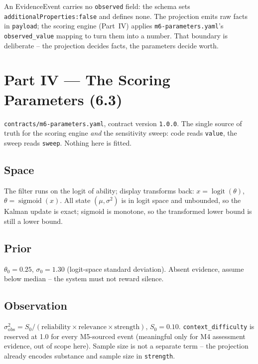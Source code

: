 \documentclass[10pt,a4paper]{article}
\DeclareMathOperator{\logit}{logit}
\DeclareMathOperator{\sig}{sigmoid}
\begin{document}
An EvidenceEvent carries no \texttt{observed} field: the schema sets
\texttt{additionalProperties:false} and defines none. The projection emits
raw facts in \texttt{payload}; the scoring engine (Part~IV) applies
\texttt{m6-parameters.yaml}'s \texttt{observed\_value} mapping to turn them
into a number. That boundary is deliberate -- the projection decides facts,
the parameters decide worth.

\section{Part IV --- The Scoring Parameters (6.3)}

\texttt{contracts/m6-parameters.yaml}, contract version \texttt{1.0.0}. The
single source of truth for the scoring engine \emph{and} the sensitivity
sweep: code reads \texttt{value}, the sweep reads \texttt{sweep}. Nothing
here is fitted.

\subsection{Space}
The filter runs on the logit of ability; display transforms back:
$x=\logit(\theta)$, $\theta=\sig(x)$. All state $(\mu,\sigma^2)$ is in logit
space and unbounded, so the Kalman update is exact; sigmoid is monotone, so
the transformed lower bound is still a lower bound.

\subsection{Prior}
$\theta_0=0.25$, $\sigma_0=1.30$ (logit-space standard deviation). Absent
evidence, assume below median -- the system must not reward silence.

\subsection{Observation}
$\sigma^2_{\mathrm{obs}} = S_0/(\text{reliability}\times\text{relevance}
\times\text{strength})$, $S_0=0.10$. \texttt{context\_difficulty} is
reserved at 1.0 for every M5-sourced event (meaningful only for M4
assessment evidence, out of scope here). Sample size is not a separate
term -- the projection already encodes substance and sample size in
\texttt{strength}.
\end{document}
